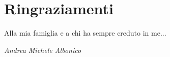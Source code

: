\chapter*{Ringraziamenti}\label{chp:00-thanks}
Alla mia famiglia e a chi ha sempre creduto in me...
\begin{flushright}
    \textit{Andrea Michele Albonico}
\end{flushright}